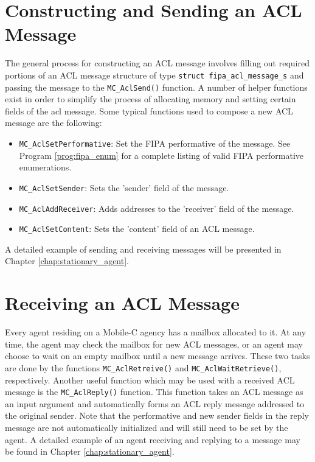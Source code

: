 \documentclass[11pt]{report}
\begin{document}
\section{Constructing and Sending an ACL Message}
The general process for constructing an ACL message involves
filling out required portions of an ACL message structure of type
\texttt{struct fipa\_acl\_message\_s} and passing the message to the
\texttt{MC\_AclSend()} function. A number of helper functions 
exist in order to simplify the process of allocating memory and setting
certain fields of the acl message. 
Some typical functions used to compose a new ACL message are the following:
\begin{itemize}
\item \texttt{MC\_AclSetPerformative}: Set the FIPA performative of the message. See Program
  \ref{prog:fipa_enum} for a complete listing of valid FIPA performative enumerations.
\item \texttt{MC\_AclSetSender}: Sets the 'sender' field of the message.
\item \texttt{MC\_AclAddReceiver}: Adds addresses to the 'receiver' field of the message.
\item \texttt{MC\_AclSetContent}: Sets the 'content' field of an ACL message.
\end{itemize}
A detailed example of sending and receiving messages will be presented in
Chapter \ref{chap:stationary_agent}.

\section{Receiving an ACL Message}
Every agent residing on a Mobile-C agency has a mailbox allocated to it.
At any time, the agent may check the mailbox for new ACL messages, or an
agent may choose to wait on an empty mailbox until a new message arrives.
These two tasks are done by the functions \texttt{MC\_AclRetreive()} and
\texttt{MC\_AclWaitRetrieve()}, respectively. 
Another useful function which may be used with a received ACL message is the
\texttt{MC\_AclReply()} function. This function takes an ACL message as an
input argument and automatically forms an ACL reply message addressed to the
original sender. Note that the performative and new sender fields in the reply
message are not automatically initialized and will still need to be set by
the agent. A detailed example of an agent receiving and replying to a message
may be found in Chapter \ref{chap:stationary_agent}.
\end{document}
